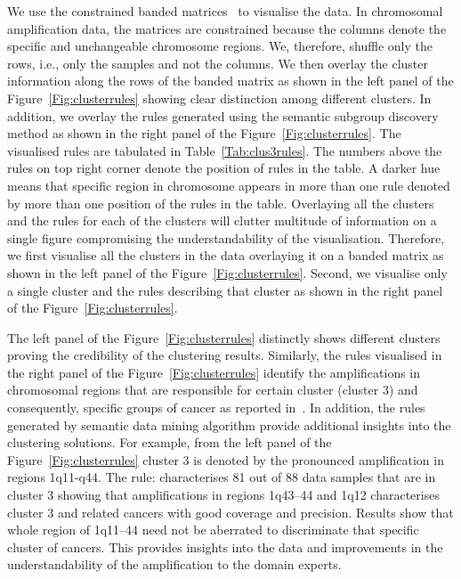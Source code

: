 We use the constrained banded matrices~\cite{garriga2011banded} to 
visualise the data.
In chromosomal amplification data, the matrices are constrained because the columns denote 
the specific and unchangeable chromosome regions. We, therefore, 
shuffle only the rows, i.e., only the samples and not the columns.
We then overlay the cluster information along the rows of the banded 
matrix as shown in the left panel  of the 
Figure~\ref{Fig:clusterrules} showing clear distinction among 
different clusters. In addition, we overlay the rules generated 
using the semantic subgroup discovery method as shown in the 
right panel of the Figure~\ref{Fig:clusterrules}. 
The visualised rules are tabulated in Table~\ref{Tab:clus3rules}.
The numbers above the rules on top right corner denote the position 
of rules in the table. A darker hue means that specific region
in chromosome appears in more than one rule denoted by more than 
one position of the rules in the table. Overlaying all the
clusters and the rules for each of the clusters will clutter
multitude of information on a single figure compromising the 
understandability of the visualisation. Therefore, we first 
visualise all the clusters in the data overlaying it on a 
banded matrix as shown in the left panel of the 
Figure~\ref{Fig:clusterrules}. Second, we visualise
only a single cluster and the rules describing that cluster as 
shown in the right panel of the Figure~\ref{Fig:clusterrules}.



The left panel of the Figure~\ref{Fig:clusterrules} distinctly 
shows different clusters proving the credibility of
the clustering results. Similarly, the rules visualised in 
the right panel of the Figure~\ref{Fig:clusterrules} identify
the amplifications in chromosomal regions that are 
responsible for certain cluster (cluster 3) and consequently, specific 
groups of cancer as reported in~\cite{myllykangas08}. In addition,
the rules generated by semantic data mining algorithm provide
additional insights into the clustering solutions. For example,
from the left panel of the Figure~\ref{Fig:clusterrules} cluster
3 is denoted by the pronounced amplification in regions 1q11-q44. 
The rule:  characterises 
81 out of 88 data samples that are in cluster 3 showing that
amplifications in regions  1q43--44 and 1q12 characterises 
cluster 3 and related cancers with good coverage and precision. 
Results show that whole region of  1q11--44 need not be aberrated 
to discriminate that specific cluster of cancers. This provides 
insights into the data and improvements  in the understandability 
of the amplification to the domain experts.




